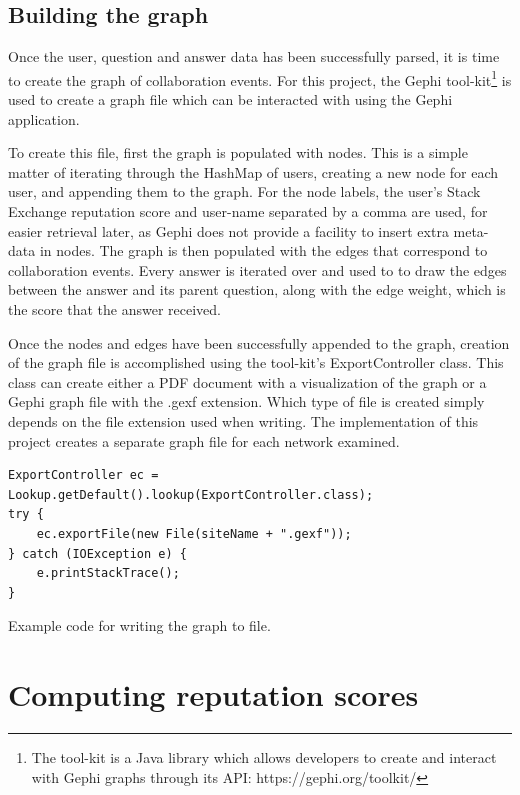 \documentclass[]{final_report}
\begin{document}
\subsection{Building the graph}

Once the user, question and answer data has been successfully parsed, it is time to create the graph of collaboration events. For this project, the Gephi tool-kit\footnote{The tool-kit is a Java library which allows developers to create and interact with Gephi graphs through its API: https://gephi.org/toolkit/} is used to create a graph file which can be interacted with using the Gephi application.

To create this file, first the graph is populated with nodes. This is a simple matter of iterating through the HashMap of users, creating a new node for each user, and appending them to the graph. For the node labels, the user's Stack Exchange reputation score and user-name separated by a comma are used, for easier retrieval later, as Gephi does not provide a facility to insert extra meta-data in nodes. The graph is then populated with the edges that correspond to collaboration events. Every answer is iterated over and used to to draw the edges between the answer and its parent question, along with the edge weight, which is the score that the answer received. 

Once the nodes and edges have been successfully appended to the graph, creation of the graph file is accomplished using the tool-kit's ExportController class. This class can create either a PDF document with a visualization of the graph or a Gephi graph file with the .gexf extension. Which type of file is created simply depends on the file extension used when writing. The implementation of this project creates a separate graph file for each network examined.

\begin{program}
\begin{verbatim}
ExportController ec = Lookup.getDefault().lookup(ExportController.class);
try {
    ec.exportFile(new File(siteName + ".gexf"));
} catch (IOException e) {
    e.printStackTrace();
}
\end{verbatim}
\caption{Example code for writing the graph to file.}
\end{program}

\section{Computing reputation scores}
\end{document}
